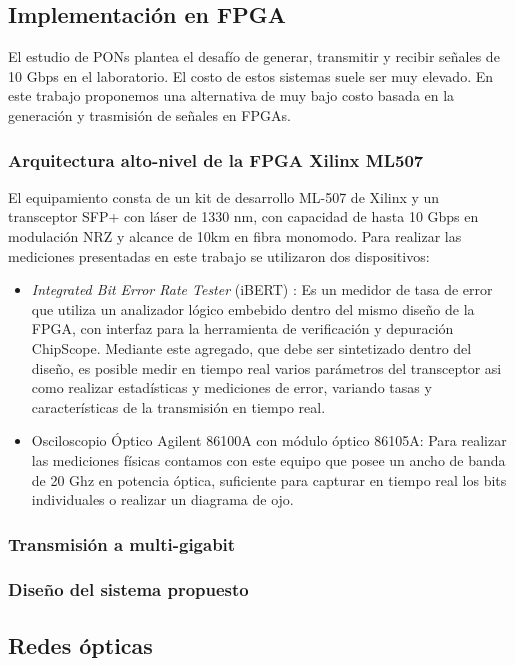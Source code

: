 \documentclass[12pt,twoside,openright]{moddalthesis}
\begin{document}
\subsection{Implementación en FPGA}
El estudio de PONs plantea el desafío de generar, transmitir y recibir
señales de 10 Gbps en el laboratorio. El costo de estos sistemas
suele ser muy elevado. En este trabajo proponemos una alternativa de muy
bajo costo basada en la generación y trasmisión de señales en FPGAs.

\subsubsection{Arquitectura alto-nivel de la FPGA Xilinx ML507}
El equipamiento consta de un kit de desarrollo ML-507 de Xilinx y un
transceptor SFP+ con láser de 1330 nm, con capacidad de hasta 10 Gbps
en modulación NRZ y alcance de 10km en fibra monomodo. Para realizar
las mediciones presentadas en este trabajo se utilizaron dos dispositivos:
\begin{itemize}
 \item {\em Integrated Bit Error Rate Tester} (iBERT) \cite{4gtxs}: Es
un medidor de tasa de error que utiliza un analizador lógico embebido dentro
del mismo diseño de la FPGA, con interfaz para la herramienta de
verificación y depuración ChipScope. Mediante este agregado, que debe
ser sintetizado dentro del diseño, es posible medir en tiempo real
varios parámetros del transceptor asi como realizar estadísticas y
mediciones de error, variando tasas y características de la transmisión
en tiempo real.
 \item Osciloscopio Óptico Agilent 86100A con módulo óptico 86105A: Para
realizar las mediciones físicas contamos con este equipo que posee un
ancho de banda de 20 Ghz en potencia óptica, suficiente para capturar en
tiempo real los bits individuales o realizar un diagrama de ojo.
\end{itemize}
\subsubsection{Transmisión a multi-gigabit}
\subsubsection{Diseño del sistema propuesto}
\subsection{Redes ópticas}
\end{document}
